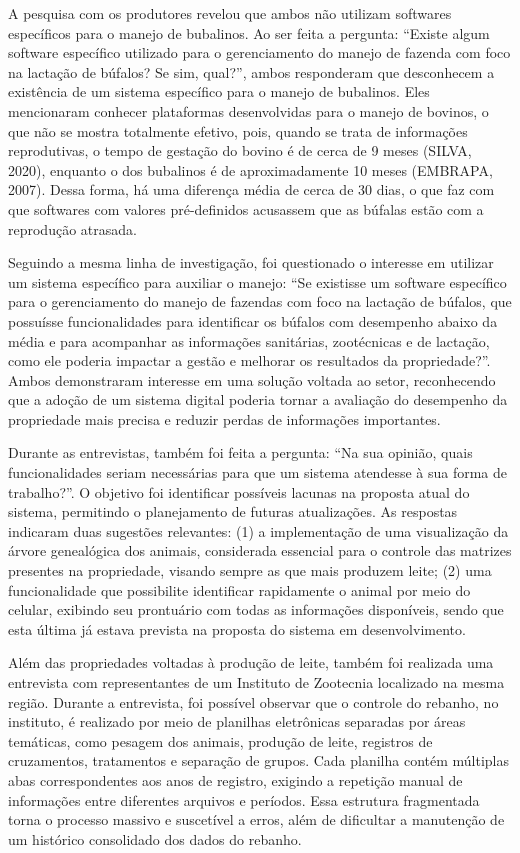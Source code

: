 A pesquisa com os produtores revelou que ambos não utilizam softwares específicos para o manejo de bubalinos. Ao ser feita a pergunta: “Existe algum software específico utilizado para o gerenciamento do manejo de fazenda com foco na lactação de búfalos? Se sim, qual?”, ambos responderam que desconhecem a existência de um sistema específico para o manejo de bubalinos. Eles mencionaram conhecer plataformas desenvolvidas para o manejo de bovinos, o que não se mostra totalmente efetivo, pois, quando se trata de informações reprodutivas, o tempo de gestação do bovino é de cerca de 9 meses (SILVA, 2020), enquanto o dos bubalinos é de aproximadamente 10 meses (EMBRAPA, 2007). Dessa forma, há uma diferença média de cerca de 30 dias, o que faz com que softwares com valores pré-definidos acusassem que as búfalas estão com a reprodução atrasada.

Seguindo a mesma linha de investigação, foi questionado o interesse em utilizar um sistema específico para auxiliar o manejo: “Se existisse um software específico para o gerenciamento do manejo de fazendas com foco na lactação de búfalos, que possuísse funcionalidades para identificar os búfalos com desempenho abaixo da média e para acompanhar as informações sanitárias, zootécnicas e de lactação, como ele poderia impactar a gestão e melhorar os resultados da propriedade?”. Ambos demonstraram interesse em uma solução voltada ao setor, reconhecendo que a adoção de um sistema digital poderia tornar a avaliação do desempenho da propriedade mais precisa e reduzir perdas de informações importantes.

Durante as entrevistas, também foi feita a pergunta: “Na sua opinião, quais funcionalidades seriam necessárias para que um sistema atendesse à sua forma de trabalho?”. O objetivo foi identificar possíveis lacunas na proposta atual do sistema, permitindo o planejamento de futuras atualizações. As respostas indicaram duas sugestões relevantes: (1) a implementação de uma visualização da árvore genealógica dos animais, considerada essencial para o controle das matrizes presentes na propriedade, visando sempre as que mais produzem leite; (2) uma funcionalidade que possibilite identificar rapidamente o animal por meio do celular, exibindo seu prontuário com todas as informações disponíveis, sendo que esta última já estava prevista na proposta do sistema em desenvolvimento.

Além das propriedades voltadas à produção de leite, também foi realizada uma entrevista com representantes de um Instituto de Zootecnia localizado na mesma região. Durante a entrevista, foi possível observar que o controle do rebanho, no instituto, é realizado por meio de planilhas eletrônicas separadas por áreas temáticas, como pesagem dos animais, produção de leite, registros de cruzamentos, tratamentos e separação de grupos. Cada planilha contém múltiplas abas correspondentes aos anos de registro, exigindo a repetição manual de informações entre diferentes arquivos e períodos. Essa estrutura fragmentada torna o processo massivo e suscetível a erros, além de dificultar a manutenção de um histórico consolidado dos dados do rebanho.

